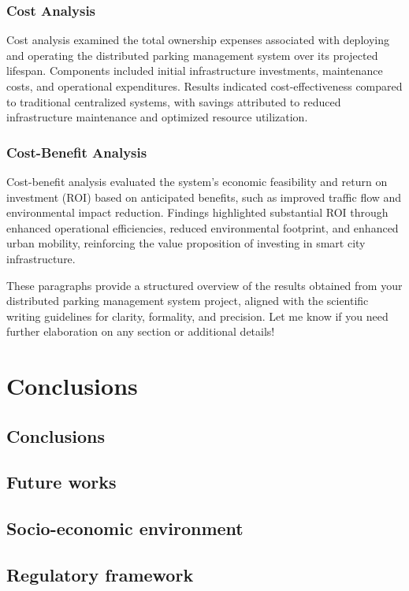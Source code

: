\documentclass[oneside, 12pt, a4paper]{book}
\begin{document}
\section{Cost Analysis}

Cost analysis examined the total ownership expenses associated with deploying and operating the distributed parking management system over its projected lifespan. Components included initial infrastructure investments, maintenance costs, and operational expenditures. Results indicated cost-effectiveness compared to traditional centralized systems, with savings attributed to reduced infrastructure maintenance and optimized resource utilization.
\section{Cost-Benefit Analysis}

Cost-benefit analysis evaluated the system's economic feasibility and return on investment (ROI) based on anticipated benefits, such as improved traffic flow and environmental impact reduction. Findings highlighted substantial ROI through enhanced operational efficiencies, reduced environmental footprint, and enhanced urban mobility, reinforcing the value proposition of investing in smart city infrastructure.

These paragraphs provide a structured overview of the results obtained from your distributed parking management system project, aligned with the scientific writing guidelines for clarity, formality, and precision. Let me know if you need further elaboration on any section or additional details!
\part{Conclusions}
\chapter{Conclusions}
\chapter{Future works}
\chapter{Socio-economic environment}
\chapter{Regulatory framework}

\printbibliography%
%
\end{document}
